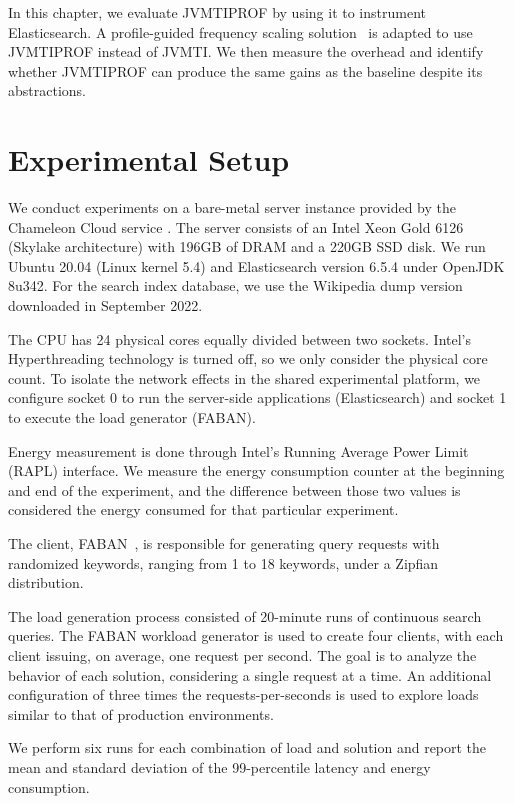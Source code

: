 \label{cap:evaluation}

In this chapter, we evaluate JVMTIPROF by using it to instrument Elasticsearch. A profile-guided frequency scaling solution~\cite{hurryupccgrid} is adapted to use JVMTIPROF instead of JVMTI. We then measure the overhead and identify whether JVMTIPROF can produce the same gains as the baseline despite its abstractions.

\section{Experimental Setup}

We conduct experiments on a bare-metal server instance provided by the Chameleon Cloud service \cite{keahey2020chameleon}. The server consists of an Intel Xeon Gold 6126 (Skylake architecture) with 196GB of DRAM and a 220GB SSD disk. We run Ubuntu 20.04 (Linux kernel 5.4) and Elasticsearch version 6.5.4 under OpenJDK 8u342. For the search index database, we use the Wikipedia dump version  downloaded in September 2022.

The CPU has 24 physical cores equally divided between two sockets. Intel's Hyperthreading technology is turned off, so we only consider the physical core count. To isolate the network effects in the shared experimental platform, we configure socket 0 to run the server-side applications (Elasticsearch) and socket 1 to execute the load generator (FABAN).

Energy measurement is done through Intel's Running Average Power Limit (RAPL) interface. We measure the energy consumption counter at the beginning and end of the experiment, and the difference between those two values is considered the energy consumed for that particular experiment.

The client, FABAN~\cite{faban}, is responsible for generating query requests with randomized keywords, ranging from 1 to 18 keywords, under a Zipfian distribution.

The load generation process consisted of 20-minute runs of continuous search queries. The FABAN workload generator is used to create four clients, with each client issuing, on average, one request per second. The goal is to analyze the behavior of each solution, considering a single request at a time. An additional configuration of three times the requests-per-seconds is used to explore loads similar to that of production environments.

We perform six runs for each combination of load and solution and report the mean and standard deviation of the 99-percentile latency and energy consumption.

